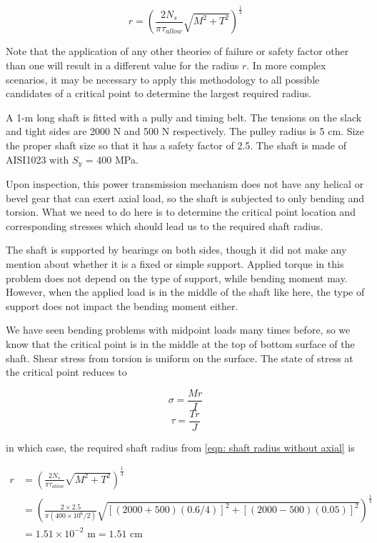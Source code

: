 \documentclass[a4paper,openany,nobib]{tufte-book}
\begin{document}
{{$$ r = \left( \frac{2 N_s}{\pi \tau_{allow}}\sqrt {M^2 + T^2} \right)^{\frac{1}{3}}$$

Note that the application of any other theories of failure or safety
factor other than one will result in a different value for the radius
\(r\). In more complex scenarios, it may be necessary to apply this
methodology to all possible candidates of a critical point to determine
the largest required radius.

A 1-m long shaft is fitted with a pully and timing belt. The tensions on
the slack and tight sides are 2000 N and 500 N respectively. The pulley
radius is 5 cm. Size the proper shaft size so that it has a safety
factor of 2.5. The shaft is made of AISI1023 with \(S_y\) = 400 MPa.


Upon inspection, this power transmission mechanism does not have any
helical or bevel gear that can exert axial load, so the shaft is
subjected to only bending and torsion. What we need to do here is to
determine the critical point location and corresponding stresses which
should lead us to the required shaft radius.

The shaft is supported by bearings on both sides, though it did not make
any mention about whether it is a fixed or simple support. Applied
torque in this problem does not depend on the type of support, while
bending moment may. However, when the applied load is in the middle of
the shaft like here, the type of support does not impact the bending
moment either.

We have seen bending problems with midpoint loads many times before, so
we know that the critical point is in the middle at the top of bottom
surface of the shaft. Shear stress from torsion is uniform on the
surface. The state of stress at the critical point reduces to

$$\sigma = \frac{Mr}{I}$$ $$\tau = \frac{Tr}{J}$$

in which case, the required shaft radius from
\ref{eqn: shaft radius without axial}
is

$$\begin{aligned}
    r &= \left( \frac{2 N_s}{\pi \tau _{allow}}\sqrt {M^2 +T^2}  \right)^{\frac{1}{3}} \\
      &= \left( \frac{2 \times 2.5}{\pi (400 \times 10^6 /2 )}\sqrt {[(2000+500)(0.6/4)]^2 +[(2000-500)(0.05)]^2}  \right)^{\frac{1}{3}} \\
      &= 1.51 \times 10^{-2} \text{ m} = 1.51 \text{ cm}
  \end{aligned}$$

}}
\end{document}
